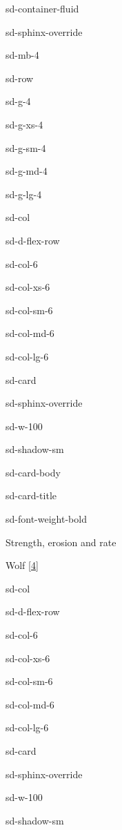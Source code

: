 \documentclass[letterpaper,10pt,english]{jupyterBook}
\let\sphinxpxdimen\pdfpxdimen\else\newdimen\sphinxpxdimen
\begin{document}
\begin{sphinxuseclass}{sd-container-fluid}
\begin{sphinxuseclass}{sd-sphinx-override}
\begin{sphinxuseclass}{sd-mb-4}
\begin{sphinxuseclass}{sd-row}
\begin{sphinxuseclass}{sd-g-4}
\begin{sphinxuseclass}{sd-g-xs-4}
\begin{sphinxuseclass}{sd-g-sm-4}
\begin{sphinxuseclass}{sd-g-md-4}
\begin{sphinxuseclass}{sd-g-lg-4}
\begin{sphinxuseclass}{sd-col}
\begin{sphinxuseclass}{sd-d-flex-row}
\begin{sphinxuseclass}{sd-col-6}
\begin{sphinxuseclass}{sd-col-xs-6}
\begin{sphinxuseclass}{sd-col-sm-6}
\begin{sphinxuseclass}{sd-col-md-6}
\begin{sphinxuseclass}{sd-col-lg-6}
\begin{sphinxuseclass}{sd-card}
\begin{sphinxuseclass}{sd-sphinx-override}
\begin{sphinxuseclass}{sd-w-100}
\begin{sphinxuseclass}{sd-shadow-sm}
\begin{sphinxuseclass}{sd-card-body}
\begin{sphinxuseclass}{sd-card-title}
\begin{sphinxuseclass}{sd-font-weight-bold}
\end{sphinxuseclass}
\end{sphinxuseclass}
\sphinxAtStartPar
Strength, erosion and rate

\noindent{\hspace*{\fill}\sphinxincludegraphics[width=200\sphinxpxdimen]{{wolfetal}.png}\hspace*{\fill}}

\sphinxAtStartPar
Wolf  {[}\hyperlink{cite.references:id7}{4}{]}

\end{sphinxuseclass}
\end{sphinxuseclass}
\end{sphinxuseclass}
\end{sphinxuseclass}
\end{sphinxuseclass}
\end{sphinxuseclass}
\end{sphinxuseclass}
\end{sphinxuseclass}
\end{sphinxuseclass}
\end{sphinxuseclass}
\end{sphinxuseclass}
\end{sphinxuseclass}
\begin{sphinxuseclass}{sd-col}
\begin{sphinxuseclass}{sd-d-flex-row}
\begin{sphinxuseclass}{sd-col-6}
\begin{sphinxuseclass}{sd-col-xs-6}
\begin{sphinxuseclass}{sd-col-sm-6}
\begin{sphinxuseclass}{sd-col-md-6}
\begin{sphinxuseclass}{sd-col-lg-6}
\begin{sphinxuseclass}{sd-card}
\begin{sphinxuseclass}{sd-sphinx-override}
\begin{sphinxuseclass}{sd-w-100}
\begin{sphinxuseclass}{sd-shadow-sm}

\end{sphinxuseclass}
\end{sphinxuseclass}
\end{sphinxuseclass}
\end{sphinxuseclass}
\end{sphinxuseclass}
\end{sphinxuseclass}
\end{sphinxuseclass}
\end{sphinxuseclass}
\end{sphinxuseclass}
\end{sphinxuseclass}
\end{sphinxuseclass}
\end{sphinxuseclass}
\end{sphinxuseclass}
\end{sphinxuseclass}
\end{sphinxuseclass}
\end{sphinxuseclass}
\end{sphinxuseclass}
\end{sphinxuseclass}
\end{sphinxuseclass}
\end{sphinxuseclass}
\end{document}
